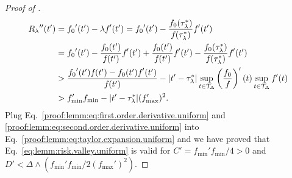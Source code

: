 \begin{proof}[Proof of ]
    \begin{align}\label{proof:lemm:eq:second.order.derivative.uniform}
    \begin{split}
    {R_{\lambda}}''({t}')
    &= {f_{0}}'({t}') - \lambda {f_{}}'({t}')
    = {f_{0}}'({t}')
    - \frac{{f_{0}}({\tau^*_\lambda})}{{f_{}}({\tau^*_\lambda})} {f_{}}'({t}') \\
    &= {f_{0}}'({t}') - \frac{{f_{0}}({t}')}{{f_{}}({t}')} {f_{}}'({t}') + \frac{{f_{0}}({t}')}{{f_{}}({t}')} {f_{}}'({t}')
    - \frac{{f_{0}}({\tau^*_\lambda})}{{f_{}}({\tau^*_\lambda})} {f_{}}'({t}') \\
    &> \frac{{f_{0}}'({t}')
     {f_{}}({t}') - {f_{0}}({t}') {f_{}}'({t}')}{{f_{}}({t}')} - |{t}' - {\tau^*_\lambda}|\sup_{{t} \in \mathcal{T}_\Delta} \left(\frac{{f_{0}}}{{f_{}}}\right)'({t}) \sup_{{t} \in \mathcal{T}_\Delta} {f_{}}'({t})\\
     &> f_{\min}' f_{\min} - |{t}' - {\tau^*_\lambda}| (f_{\max}')^2.
     \end{split}
    \end{align}
    Plug Eq.~\eqref{proof:lemm:eq:first.order.derivative.uniform} and \eqref{proof:lemm:eq:second.order.derivative.uniform} into Eq.~\eqref{proof:lemm:eq:taylor.expansion.uniform} and we have proved that Eq.~\eqref{eq:lemm:risk.valley.uniform} is valid for $C' =  f_{\min}' f_{\min}/4 > 0$ and $D' < \Delta \wedge (f_{\min}' f_{\min}/2(f_{\max}')^2)$.



\end{proof}
